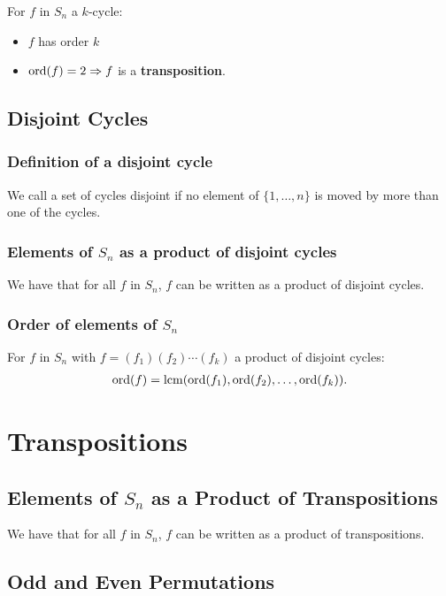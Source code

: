 \documentclass[a4paper, 12pt, twoside]{article}
\begin{document}
For $f$ in $S_n$ a $k$-cycle:

\begin{itemize}
      \item $f$ has order $k$
      \item $\operatorname{ord}(f) = 2 \Rightarrow f$ is a \textbf{transposition}.
\end{itemize}

\subsection{Disjoint Cycles}

\subsubsection{Definition of a disjoint cycle}

We call a set of cycles disjoint if no element of $\{1, \ldots, n\}$ is
moved by more than one of the cycles.

\subsubsection{Elements of $S_n$ as a product of disjoint cycles}

We have that for all $f$ in $S_n$, $f$ can be written as a product
of disjoint cycles.

\subsubsection{Order of elements of $S_n$}

For $f$ in $S_n$ with $f = (f_1)(f_2)\cdots(f_k)$ a product of
disjoint cycles:
\begin{align*}
      \operatorname{ord}(f) = \operatorname{lcm}(\operatorname{ord}(f_1), \operatorname{ord}(f_2), \ldots, \operatorname{ord}(f_k)).
\end{align*}

\section{Transpositions}

\subsection{Elements of $S_n$ as a Product of Transpositions}

We have that for all $f$ in $S_n$, $f$ can be written as a product
of transpositions.

\subsection{Odd and Even Permutations}
\end{document}
